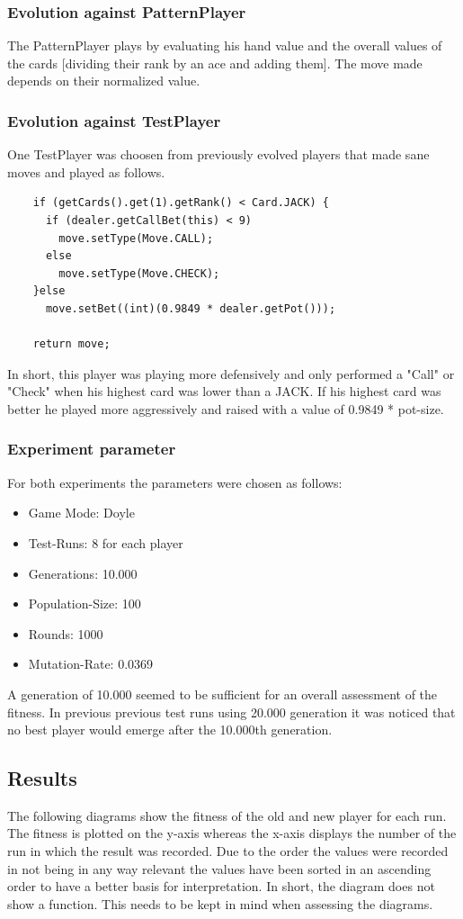\documentclass[12pt,fleqn,a4paper]{article}
\begin{document}
\subsubsection{Evolution against PatternPlayer}
The PatternPlayer plays by evaluating his hand value and the overall values of the cards [dividing their rank by an ace and adding them].
The move made depends on their normalized value.

\subsubsection{Evolution against TestPlayer}
One TestPlayer was choosen from previously evolved players that made sane moves and played as follows.
\\
\begin{lstlisting}
	if (getCards().get(1).getRank() < Card.JACK) {
	  if (dealer.getCallBet(this) < 9)
		move.setType(Move.CALL);
	  else
		move.setType(Move.CHECK);
	}else
	  move.setBet((int)(0.9849 * dealer.getPot()));
		
	return move;
\end{lstlisting}

In short, this player was playing more defensively and only performed a "Call" or "Check" when his highest card was lower than a JACK. If his highest card was better he played more aggressively and raised with a value of 0.9849 * pot-size.

\newpage
\subsubsection{Experiment parameter}
For both experiments the parameters were chosen as follows: 
\begin{itemize}
	\item Game Mode:       Doyle
	\item Test-Runs:       8 for each player
	\item Generations:     10.000
	\item Population-Size: 100
	\item Rounds:          1000
	\item Mutation-Rate:   0.0369
\end{itemize} 

A generation of 10.000 seemed to be sufficient for an overall assessment of the fitness. In previous previous test runs using 20.000 generation it was noticed that no best player would emerge after the 10.000th generation.

\subsection{Results}
The following diagrams show the fitness of the old and new player for each run. \\
The fitness is plotted on the y-axis whereas the x-axis displays the number of the run in which the result was recorded. Due to the order the values were recorded in not being in any way relevant the values have been sorted in an ascending order to have a better basis for interpretation. In short, the diagram does not show a function. This needs to be kept in mind when assessing the diagrams.
\end{document}
